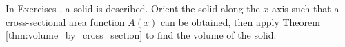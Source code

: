 {\noindent In Exercises}
{, a solid is described. Orient the solid along the $x$-axis such that a cross-sectional area function $A(x)$ can be obtained, then apply Theorem \ref{thm:volume_by_cross_section} to find the volume of the solid.
}
